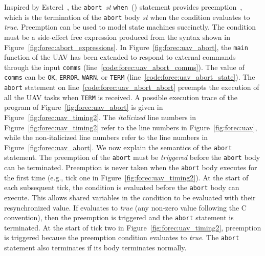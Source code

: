 Inspired by Esterel~\cite{timed_esterel}, the
\verb$abort$~\emph{st} \verb$when$~(\expression{}) statement
provides preemption~\cite{timed_preemption}, which is the
termination of the \verb$abort$ body \emph{st} when the
condition \expression{} evaluates to \emph{true}. Preemption
can be used to model state machines succinctly. The
condition \expression{} must be a side-effect free
expression produced from the syntax shown 
in Figure~\ref{fig:forec:abort_expressions}. 
In Figure~\ref{fig:forec:uav_abort},
the \verb$main$ function of the UAV has been extended to
respond to external commands through the input 
\verb$comms$ (line~\ref{code:forec:uav_abort_comms}). 
The value of \verb$comms$ can be \verb$OK$, \verb$ERROR$, 
\verb$WARN$, or \verb$TERM$ (line~\ref{code:forec:uav_abort_state}).
The \verb$abort$ statement on
line~\ref{code:forec:uav_abort_abort} preempts the 
execution of all the UAV tasks when \verb$TERM$
is received. A possible execution trace of the 
program of Figure~\ref{fig:forec:uav_abort} is given in
Figure~\ref{fig:forec:uav_timing2}. The \emph{italicized}
line numbers in Figure~\ref{fig:forec:uav_timing2} refer 
to the line numbers in Figure~\ref{fig:forec:uav}, while 
the non-italicized line numbers refer to the line numbers in 
Figure~\ref{fig:forec:uav_abort}. We now explain the semantics of
the \verb$abort$ statement. The preemption of the
\verb$abort$ must be \emph{triggered} before the \verb$abort$
body can be terminated. Preemption is never taken when the
\verb$abort$ body executes for the first time (e.g., tick
one in Figure~\ref{fig:forec:uav_timing2}). At the start of
each subsequent tick, the condition \expression{} is
evaluated before the \verb$abort$ body can execute. This
allows shared variables in the condition to be evaluated
with their resynchronized value. If \expression{} 
evaluates to \emph{true} (any non-zero value following the C
convention), then the preemption is triggered and the
\verb$abort$ statement is terminated. At the start of tick
two in Figure~\ref{fig:forec:uav_timing2}, preemption is
triggered because the preemption condition evaluates to \emph{true}.
The \verb$abort$ statement also terminates if its body
terminates normally. 

